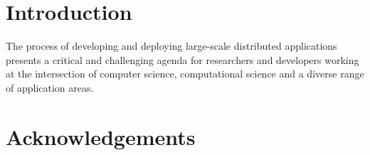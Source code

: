\documentclass[10pt,letterpaper]{article}
\begin{document}
\section{Introduction}

The process of developing and deploying large-scale distributed
applications presents a critical and challenging agenda for
researchers and developers working at the intersection of computer
science, computational science and a diverse range of application
areas. 


\section*{Acknowledgements}

%


\end{document}
